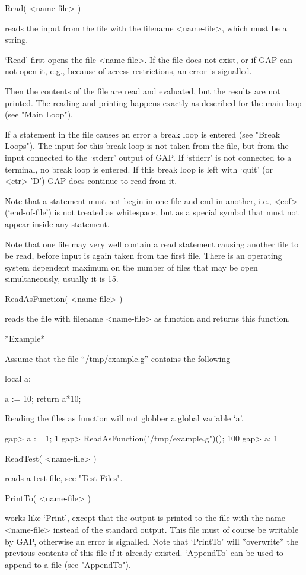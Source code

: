 \>Read( <name-file> )

reads the input from the  file with the  filename <name-file>, which must
be a string.

`Read' first opens the file <name-file>.  If the file  does not exist, or
if GAP can not open it, e.g., because of access restrictions, an error is
signalled.

Then the contents of the file are read and evaluated, but the results are
not printed.  The reading and  printing happens exactly as described  for
the main loop (see "Main Loop").

If a statement in the file causes  an error a  break loop is entered (see
"Break  Loops").  The input   for this break loop  is  not taken from the
file, but from  the input connected to the  `stderr'  output of GAP.   If
`stderr' is not connected  to a terminal, no break  loop is  entered.  If
this break loop is left  with `quit' (or <ctr>-'D')  GAP does continue to
read from it.

Note that  a statement must  not begin in one  file  and end  in another,
i.e.,  <eof> (`end-of-file') is not    treated as whitespace,  but as   a
special symbol that must not appear inside any statement.

Note that one file may very well contain a read statement causing another
file to be read, before input is again taken from the  first file.  There
is an operating system dependent maximum on the  number of files that may
be open simultaneously, usually it is 15.

\>ReadAsFunction( <name-file> )

reads the  file  with filename <name-file> as  function  and returns this
function.

*Example*

Assume that the file ``/tmp/example.g'' contains the following

\begintt
    local a;

    a := 10;
    return a*10;
\endtt

Reading the files as function will not globber a global variable `a'.

\begintt
    gap> a := 1;
    1
    gap> ReadAsFunction("/tmp/example.g")();
    100
    gap> a;
    1
\endtt

\>ReadTest( <name-file> )

reads a test file, see "Test Files".

\>PrintTo( <name-file> )

works like `Print',  except that the output  is printed to the  file with
the name <name-file>  instead of the standard output.   This file must of
course be writable by  GAP, otherwise an  error is signalled.  Note  that
`PrintTo' will  *overwrite*  the  previous contents  of  this file  if it
already existed.  `AppendTo'  can   be used to   append to  a file   (see
"AppendTo").
    
